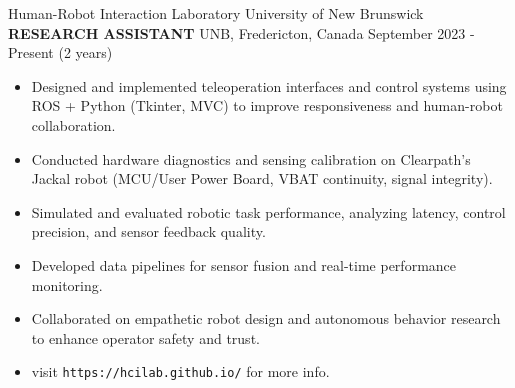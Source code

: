 

\begin{cventries}
    \cventry
    {Human-Robot Interaction Laboratory \textemdash University of New Brunswick}
    {\textbf{RESEARCH ASSISTANT}}
    {UNB, Fredericton, Canada}
    {September 2023 - Present (2 years)}
    {
        \vspace{0.2 cm}
        \begin{itemize}
            \item Designed and implemented teleoperation interfaces and control systems using ROS + Python (Tkinter, MVC) to improve responsiveness and human-robot collaboration.
            \item Conducted hardware diagnostics and sensing calibration on Clearpath’s Jackal robot (MCU/User Power Board, VBAT continuity, signal integrity).
            \item Simulated and evaluated robotic task performance, analyzing latency, control precision, and sensor feedback quality.
            \item Developed data pipelines for sensor fusion and real-time performance monitoring.
            \item Collaborated on empathetic robot design and autonomous behavior research to enhance operator safety and trust.
            \item visit \texttt{https://hcilab.github.io/} for more info.
        \end{itemize}
    }
\end{cventries}
